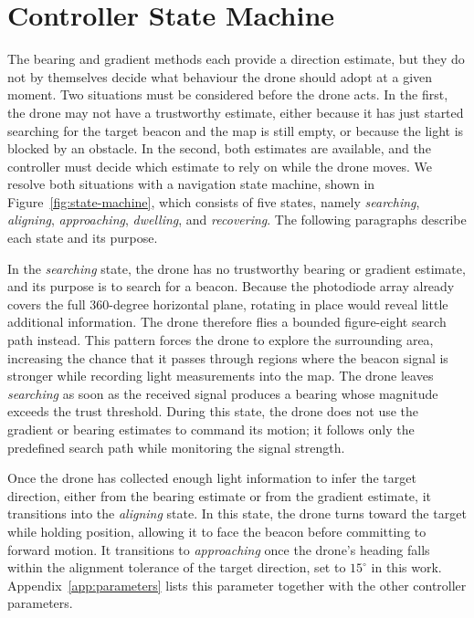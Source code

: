 \section{Controller State Machine}

\label{sec:state-machine}
The bearing and gradient methods each provide a direction estimate, but they do not by themselves decide what behaviour the drone should adopt at a given moment. Two situations must be considered before the drone acts. In the first, the drone may not have a trustworthy estimate, either because it has just started searching for the target beacon and the map is still empty, or because the light is blocked by an obstacle. In the second, both estimates are available, and the controller must decide which estimate to rely on while the drone moves. We resolve both situations with a navigation state machine, shown in Figure~\ref{fig:state-machine}, which consists of five states, namely \emph{searching}, \emph{aligning}, \emph{approaching}, \emph{dwelling}, and \emph{recovering}. The following paragraphs describe each state and its purpose.


In the \emph{searching} state, the drone has no trustworthy bearing or gradient estimate, and its purpose is to search for a beacon. Because the photodiode array already covers the full 360-degree horizontal plane, rotating in place would reveal little additional information. The drone therefore flies a bounded figure-eight search path instead. This pattern forces the drone to explore the surrounding area, increasing the chance that it passes through regions where the beacon signal is stronger while recording light measurements into the map. The drone leaves \emph{searching} as soon as the received signal produces a bearing whose magnitude exceeds the trust threshold. During this state, the drone does not use the gradient or bearing estimates to command its motion; it follows only the predefined search path while monitoring the signal strength.


Once the drone has collected enough light information to infer the target direction, either from the bearing estimate or from the gradient estimate, it transitions into the \emph{aligning} state. In this state, the drone turns toward the target while holding position, allowing it to face the beacon before committing to forward motion. It transitions to \emph{approaching} once the drone's heading falls within the alignment tolerance of the target direction, set to $15^\circ$ in this work. Appendix~\ref{app:parameters} lists this parameter together with the other controller parameters.


